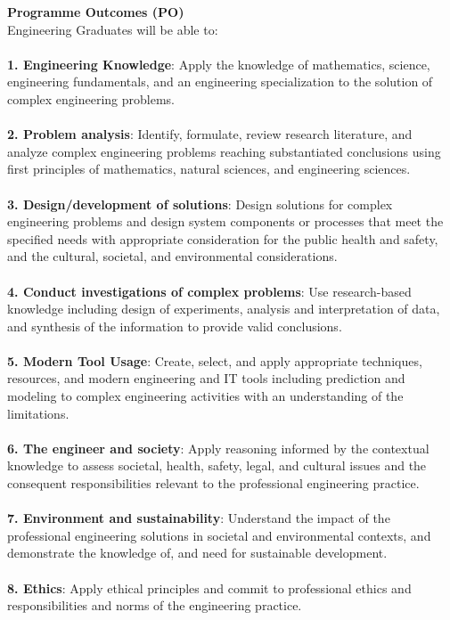	\textbf{Programme Outcomes (PO)} \\
	Engineering Graduates will be able to: \\ \\
	\textbf{1. 	Engineering Knowledge}: Apply the knowledge of mathematics, science, engineering fundamentals, and an engineering specialization to the solution of complex engineering problems. \\ \\
	\textbf{2.	Problem analysis}: Identify, formulate, review research literature, and analyze complex engineering problems reaching substantiated conclusions using first principles of mathematics, natural sciences, and engineering sciences. \\ \\
	\textbf{3.	Design/development of solutions}: Design solutions for complex engineering problems and design system components or processes that meet the specified needs with appropriate consideration for the public health and safety, and the cultural, societal, and environmental considerations. \\ \\
	\textbf{4. Conduct investigations of complex problems}: Use research-based knowledge including design of experiments, analysis and interpretation of data, and synthesis of the information to provide valid conclusions. \\ \\
	\textbf{5.	Modern Tool Usage}: Create, select, and apply appropriate techniques, resources, and modern engineering and IT tools including prediction and modeling to complex engineering activities with an understanding of the limitations. \\ \\
	\textbf{6.	The engineer and society}: Apply reasoning informed by the contextual knowledge to assess societal, health, safety, legal, and cultural issues and the consequent responsibilities relevant to the professional engineering practice. \\ \\
	\textbf{7.	Environment and sustainability}: Understand the impact of the professional engineering solutions in societal and environmental contexts, and demonstrate the knowledge of, and need for sustainable development. \\ \\
	\textbf{8.	Ethics}: Apply ethical principles and commit to professional ethics and responsibilities and norms of the engineering practice. \\ \\
